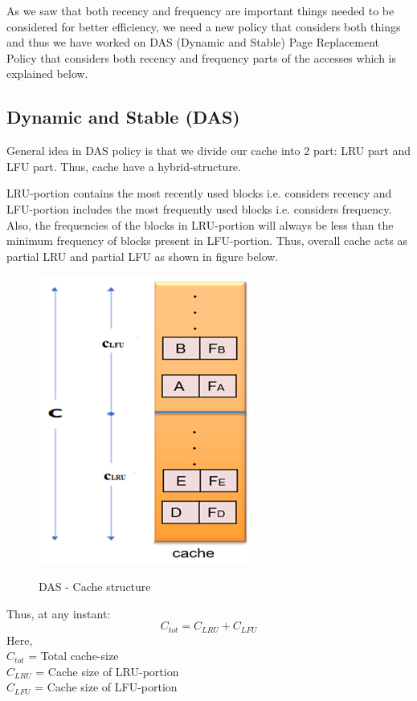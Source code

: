\documentclass[conference]{IEEEtran}
\begin{document}
As we saw that both recency and frequency are important things needed to be considered for better efficiency, we need a new policy that considers both things and thus we have worked on DAS (Dynamic and Stable) Page Replacement Policy that considers both recency and frequency parts of the accesses which is explained below.

\subsection{\textbf{Dynamic and Stable (DAS)}}

General idea in DAS policy is that we divide our cache into 2 part: LRU part and LFU part. Thus, cache have a hybrid-structure.

LRU-portion contains the most recently used blocks i.e. considers recency and  LFU-portion includes the most frequently used blocks i.e. considers frequency. Also, the frequencies of the blocks in LRU-portion will always be less than the minimum frequency of blocks present in LFU-portion. Thus, overall cache acts as partial LRU and partial LFU as shown in figure below.

\begin{figure}
        \centering
       \includegraphics[scale=0.6]{Picture1.png}~
       \caption{DAS - Cache structure}\label{Fig:1}
 \end{figure}
Thus, at any instant:
\begin{equation}
    C_{tot} = C_{LRU} + C_{LFU}
\end{equation}
Here, \\
$C_{tot}$ = Total cache-size \\
$C_{LRU}$ = Cache size of LRU-portion \\
$C_{LFU}$ = Cache size of LFU-portion \\
\end{document}
